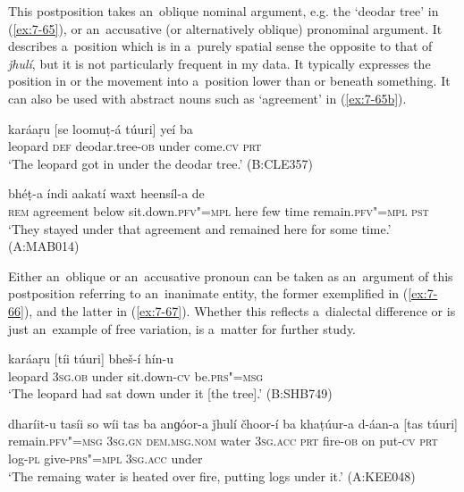  This postposition takes an~oblique nominal argument, e.g. the `deodar tree' in (\ref{ex:7-65}), or an~accusative (or alternatively oblique) pronominal argument. It describes a~position which is in a~purely spatial sense the opposite to that of \textit{ǰhulí}, but it is not particularly frequent in my data. It typically expresses the position in or the movement into a~position lower than or beneath something. It can also be used with abstract nouns such as `agreement' in  (\ref{ex:7-65b}).

\begin{exe}
\ex
\label{ex:7-65}
\gll karáaṛu [se loomuṭ-á túuri] yeí ba \\
leopard \textsc{def} deodar.tree-\textsc{ob} under come.\textsc{cv} \textsc{prt} \\
\glt `The leopard got in under the deodar tree.' (B:CLE357)

\ex
\label{ex:7-65b}
 bhéṭ-a índi aakatí waxt heensíl-a de\\
\textsc{rem} agreement below sit.down.\textsc{pfv"=mpl} here few time remain.\textsc{pfv"=mpl} \textsc{pst}\\
\glt `They stayed under that agreement and remained here for some time.' (A:MAB014)
\end{exe}

Either an~oblique or an~accusative pronoun can be taken as an~argument of this postposition referring to an~inanimate entity, the former exemplified in (\ref{ex:7-66}), and the latter in (\ref{ex:7-67}). Whether this reflects a~dialectal difference or is just an~example of free variation, is a~matter for further study.

\begin{exe}
\ex
\label{ex:7-66}
\gll karáaṛu [tíi túuri] bheš-í hín-u \\
leopard \textsc{3sg.ob} under sit.down-\textsc{cv} be.\textsc{prs"=msg } \\
\glt `The leopard had sat down under it [the tree].' (B:SHB749)
\end{exe}
\begin{exe}
\ex
\label{ex:7-67}
\gll dharíit-u tasíi so wíi tas ba anɡóor-a ǰhulí čhoor-í ba
khaṭúur-a d-áan-a [tas túuri] \\
remain.\textsc{pfv"=msg} \textsc{3sg.gn} \textsc{dem.msg.nom} water \textsc{3sg.acc} \textsc{prt}  fire-\textsc{ob} on put-\textsc{cv} \textsc{prt} log-\textsc{pl} give-\textsc{prs"=mpl } \textsc{3sg.acc} under   \\
\glt `The remaing water is heated over fire, putting logs under it.' (A:KEE048)
\end{exe}

